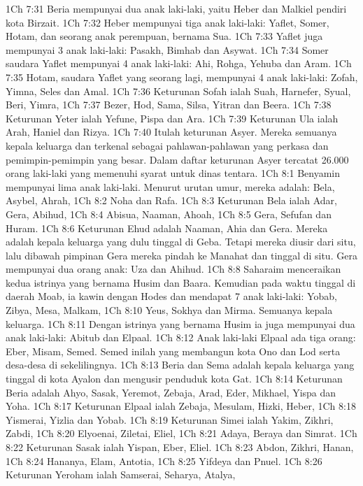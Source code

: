 1Ch 7:31  Beria mempunyai dua anak laki-laki, yaitu Heber dan Malkiel pendiri kota Birzait.
1Ch 7:32  Heber mempunyai tiga anak laki-laki: Yaflet, Somer, Hotam, dan seorang anak perempuan, bernama Sua.
1Ch 7:33  Yaflet juga mempunyai 3 anak laki-laki: Pasakh, Bimhab dan Asywat.
1Ch 7:34  Somer saudara Yaflet mempunyai 4 anak laki-laki: Ahi, Rohga, Yehuba dan Aram.
1Ch 7:35  Hotam, saudara Yaflet yang seorang lagi, mempunyai 4 anak laki-laki: Zofah, Yimna, Seles dan Amal.
1Ch 7:36  Keturunan Sofah ialah Suah, Harnefer, Syual, Beri, Yimra,
1Ch 7:37  Bezer, Hod, Sama, Silsa, Yitran dan Beera.
1Ch 7:38  Keturunan Yeter ialah Yefune, Pispa dan Ara.
1Ch 7:39  Keturunan Ula ialah Arah, Haniel dan Rizya.
1Ch 7:40  Itulah keturunan Asyer. Mereka semuanya kepala keluarga dan terkenal sebagai pahlawan-pahlawan yang perkasa dan pemimpin-pemimpin yang besar. Dalam daftar keturunan Asyer tercatat 26.000 orang laki-laki yang memenuhi syarat untuk dinas tentara.
1Ch 8:1  Benyamin mempunyai lima anak laki-laki. Menurut urutan umur, mereka adalah: Bela, Asybel, Ahrah,
1Ch 8:2  Noha dan Rafa.
1Ch 8:3  Keturunan Bela ialah Adar, Gera, Abihud,
1Ch 8:4  Abisua, Naaman, Ahoah,
1Ch 8:5  Gera, Sefufan dan Huram.
1Ch 8:6  Keturunan Ehud adalah Naaman, Ahia dan Gera. Mereka adalah kepala keluarga yang dulu tinggal di Geba. Tetapi mereka diusir dari situ, lalu dibawah pimpinan Gera mereka pindah ke Manahat dan tinggal di situ. Gera mempunyai dua orang anak: Uza dan Ahihud.
1Ch 8:8  Saharaim menceraikan kedua istrinya yang bernama Husim dan Baara. Kemudian pada waktu tinggal di daerah Moab, ia kawin dengan Hodes dan mendapat 7 anak laki-laki: Yobab, Zibya, Mesa, Malkam,
1Ch 8:10  Yeus, Sokhya dan Mirma. Semuanya kepala keluarga.
1Ch 8:11  Dengan istrinya yang bernama Husim ia juga mempunyai dua anak laki-laki: Abitub dan Elpaal.
1Ch 8:12  Anak laki-laki Elpaal ada tiga orang: Eber, Misam, Semed. Semed inilah yang membangun kota Ono dan Lod serta desa-desa di sekelilingnya.
1Ch 8:13  Beria dan Sema adalah kepala keluarga yang tinggal di kota Ayalon dan mengusir penduduk kota Gat.
1Ch 8:14  Keturunan Beria adalah Ahyo, Sasak, Yeremot, Zebaja, Arad, Eder, Mikhael, Yispa dan Yoha.
1Ch 8:17  Keturunan Elpaal ialah Zebaja, Mesulam, Hizki, Heber,
1Ch 8:18  Yismerai, Yizlia dan Yobab.
1Ch 8:19  Keturunan Simei ialah Yakim, Zikhri, Zabdi,
1Ch 8:20  Elyoenai, Ziletai, Eliel,
1Ch 8:21  Adaya, Beraya dan Simrat.
1Ch 8:22  Keturunan Sasak ialah Yispan, Eber, Eliel.
1Ch 8:23  Abdon, Zikhri, Hanan,
1Ch 8:24  Hananya, Elam, Antotia,
1Ch 8:25  Yifdeya dan Pnuel.
1Ch 8:26  Keturunan Yeroham ialah Samserai, Seharya, Atalya,
